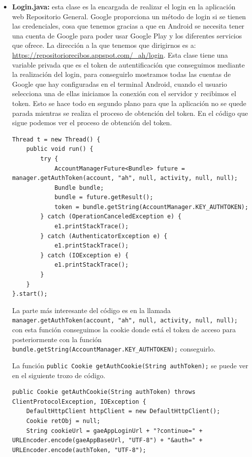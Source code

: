 \begin{itemize}

\item \textbf{Login.java:} esta clase es la encargada de realizar el login en la aplicación web Repositorio General. Google proporciona un método de login si se tienen las credenciales, cosa que tenemos gracias a que en Android se necesita tener una cuenta de Google para poder usar Google Play y los diferentes servicios que ofrece. La dirección a la que tenemos que dirigirnos es a: \url{https://repositoriorecibos.appspot.com/\_ah/login}. Esta clase tiene una variable privada que es el token de autentificación que conseguimos mediante la realización del login, para conseguirlo mostramos todas las cuentas de Google que hay configuradas en el terminal Android, cuando el usuario selecciona una de ellas iniciamos la conexión con el servidor y recibimos el token. Esto se hace todo en segundo plano para que la aplicación no se quede parada mientras se realiza el proceso de obtención del token. En el código que sigue podemos ver el proceso de obtención del token.

\begin{lstlisting}[style=Java]
Thread t = new Thread() {
	public void run() {
		try {
			AccountManagerFuture<Bundle> future = manager.getAuthToken(account, "ah", null, activity, null, null);
			Bundle bundle;
			bundle = future.getResult();
			token = bundle.getString(AccountManager.KEY_AUTHTOKEN);
		} catch (OperationCanceledException e) {
			e1.printStackTrace();
		} catch (AuthenticatorException e) {
			e1.printStackTrace();
		} catch (IOException e) {
			e1.printStackTrace();
		}
	}
}.start();
\end{lstlisting} 

La parte más interesante del código es en la llamada \lstinline{manager.getAuthToken(account, "ah", null, activity, null, null);} con esta función conseguimos la cookie donde está el token de acceso para posteriormente con la función \lstinline{bundle.getString(AccountManager.KEY_AUTHTOKEN);} conseguirlo.

La función \lstinline{public Cookie getAuthCookie(String authToken);} se puede ver en el siguiente trozo de código.

\begin{lstlisting}[style=Java]
public Cookie getAuthCookie(String authToken) throws ClientProtocolException, IOException {
	DefaultHttpClient httpClient = new DefaultHttpClient();
	Cookie retObj = null;
	String cookieUrl = gaeAppLoginUrl + "?continue=" + URLEncoder.encode(gaeAppBaseUrl, "UTF-8") + "&auth=" + URLEncoder.encode(authToken, "UTF-8");
	

\end{lstlisting}
\end{itemize}
